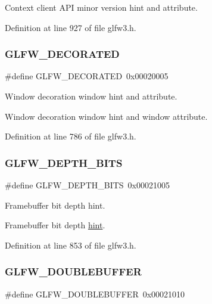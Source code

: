 Context client A\+PI minor version hint and attribute. 

Definition at line 927 of file glfw3.\+h.

\mbox{\label{group__window_ga21b854d36314c94d65aed84405b2f25e}} 
\subsubsection{\texorpdfstring{GLFW\_DECORATED}{GLFW\_DECORATED}}
{\footnotesize\ttfamily \#define G\+L\+F\+W\+\_\+\+D\+E\+C\+O\+R\+A\+T\+ED~0x00020005}



Window decoration window hint and attribute. 

Window decoration window hint and window attribute. 

Definition at line 786 of file glfw3.\+h.

\mbox{\label{group__window_ga318a55eac1fee57dfe593b6d38149d07}} 
\subsubsection{\texorpdfstring{GLFW\_DEPTH\_BITS}{GLFW\_DEPTH\_BITS}}
{\footnotesize\ttfamily \#define G\+L\+F\+W\+\_\+\+D\+E\+P\+T\+H\+\_\+\+B\+I\+TS~0x00021005}



Framebuffer bit depth hint. 

Framebuffer bit depth \mbox{\hyperlink{group__window_ga318a55eac1fee57dfe593b6d38149d07}{hint}}. 

Definition at line 853 of file glfw3.\+h.

\mbox{\label{group__window_ga714a5d569e8a274ea58fdfa020955339}} 
\subsubsection{\texorpdfstring{GLFW\_DOUBLEBUFFER}{GLFW\_DOUBLEBUFFER}}
{\footnotesize\ttfamily \#define G\+L\+F\+W\+\_\+\+D\+O\+U\+B\+L\+E\+B\+U\+F\+F\+ER~0x00021010}



